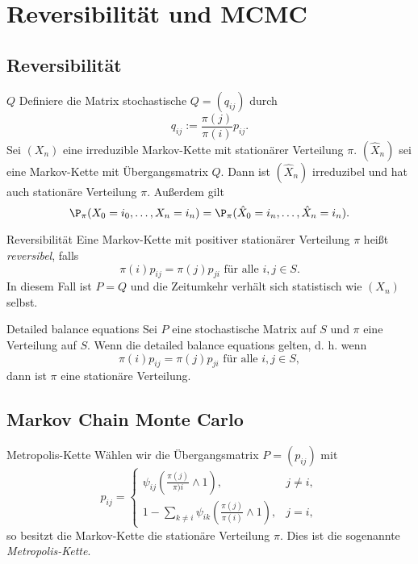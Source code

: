 \section{Reversibilität und MCMC}

\subsection*{Reversibilität}

\begin{karte}{\(Q\)}
    Definiere die Matrix stochastische \(Q = (q_{ij})\) durch 
    \[ q_{ij} := \frac{\pi(j)}{\pi(i)} p_{ij}. \]
    Sei \((X_n)\) eine irreduzible Markov-Kette mit stationärer Verteilung \(\pi\).
    \((\hat{X}_n)\) sei eine Markov-Kette mit Übergangsmatrix \(Q\).
    Dann ist \((\hat{X}_n)\) irreduzibel und hat auch stationäre Verteilung \(\pi\).
    Außerdem gilt
    \[ \P_\pi(X_0 = i_0,\ldots, X_n = i_n) = \P_\pi (\hat{X}_0 = i_n, \ldots, \hat{X}_n = i_n). \]
\end{karte}

\begin{karte}{Reversibilität}
    Eine Markov-Kette mit positiver stationärer Verteilung \(\pi\) 
    heißt \textit{reversibel}, falls 
    \[ \pi(i) p_{ij} = \pi(j) p_{ji} \text{ für alle } i,j\in S. \]
    In diesem Fall ist \(P=Q\) und die Zeitumkehr verhält sich statistisch wie \((X_n)\) selbst.
\end{karte}

\begin{karte}{Detailed balance equations}
    Sei \(P\) eine stochastische Matrix auf \(S\) und \(\pi\) eine Verteilung auf \(S\). 
    Wenn die detailed balance equations gelten, d. h. wenn 
    \[ \pi(i) p_{ij} = \pi(j) p_{ji} \text{ für alle } i,j\in S, \]
    dann ist \(\pi\) eine stationäre Verteilung.
\end{karte}

\subsection*{Markov Chain Monte Carlo}

\begin{karte}{Metropolis-Kette}
    Wählen wir die Übergangsmatrix \(P=(p_{ij})\) mit 
    \[ p_{ij} = \begin{cases}
        \psi_{ij} \left( \frac{\pi(j)}{\pi)i} \wedge 1 \right), & j\neq i, \\
        1 - \sum_{k\neq i} \psi_{ik} \left( \frac{\pi(j)}{\pi(i)} \wedge 1 \right), & j = i,
    \end{cases} \]
    so besitzt die Markov-Kette die stationäre Verteilung \(\pi\). Dies ist die sogenannte 
    \textit{Metropolis-Kette}.
\end{karte}

\begin{karte}{}

\end{karte}

\begin{karte}{}

\end{karte}

\begin{karte}{}

\end{karte}